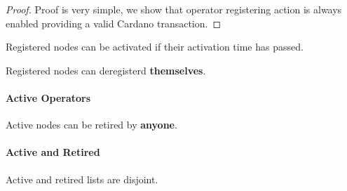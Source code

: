 \begin{proof}
  Proof is very simple, we show that operator registering action is always
enabled providing a valid Cardano transaction.
  \end{proof}

\begin{theorem}
  \label{thm:OperatorDirectory.Properties.Registered.RegisteredBecomeActive}
  \leanok
Registered nodes can be activated if their activation time has passed.
  \end{theorem}
\begin{theorem}
  \label{thm:OperatorDirectory.Properties.Registered.RegisterDeregister}
  \leanok
Registered nodes can deregisterd \textbf{themselves}.
  \end{theorem}

\paragraph{Active Operators}

\begin{theorem}
  \label{thm:OperatorDirectory.Properties.ActiveOpDir.ActiveNodesRetire}
  \leanok
Active nodes can be retired by \textbf{anyone}.
  \end{theorem}

\paragraph*{Active and Retired}

\begin{theorem}
  \label{thm:OperatorDirectory.Properties.NonRetiredActive}
  \leanok
  Active and retired lists are disjoint.
  \end{theorem}




